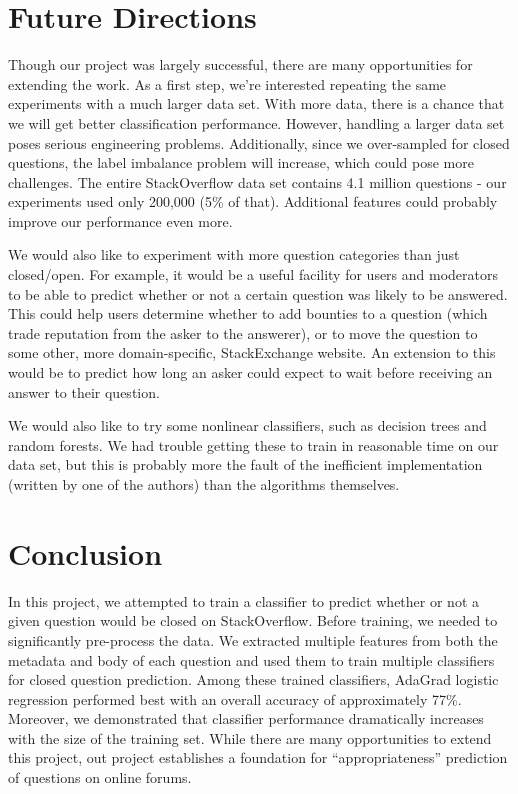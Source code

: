 \documentclass[11pt]{article}
\begin{document}
\section{Future Directions}
Though our project was largely successful, there are many
opportunities for extending the work.  As a first step, we're
interested repeating the same experiments with a much larger data
set. With more data, there is a chance that we will get better
classification performance. However, handling a larger data set poses
serious engineering problems. Additionally, since we over-sampled for closed questions, the label imbalance problem will increase, which could pose more challenges. The entire
StackOverflow data set contains 4.1 million questions - our experiments used only 200,000 (5\% of that).
Additional features could probably improve our performance even more.

We would also like to experiment with more question categories than just closed/open. For example, it would be a useful facility for users and moderators to be able to predict whether or not a certain question was likely to be answered. This could help users determine whether to add bounties to a question (which trade reputation from the asker to the answerer), or to move the question to some other, more domain-specific, StackExchange website. An extension to this would be to predict how long an asker could expect to wait before receiving an answer to their question.

We would also like to try some nonlinear classifiers, such as decision trees and random forests. We had trouble getting these to train in reasonable time on our data set, but this is probably more the fault of the inefficient implementation (written by one of the authors) than the algorithms themselves.

\section{Conclusion}
In this project, we attempted to train a classifier to predict whether
or not a given question would be closed on StackOverflow. Before
training, we needed to significantly pre-process the data. We
extracted multiple features from both the metadata and body of each
question and used them to train multiple classifiers for closed
question prediction. Among these trained classifiers, AdaGrad logistic
regression performed best with an overall accuracy of approximately
77\%. Moreover, we demonstrated that classifier performance
dramatically increases with the size of the training set.  While there
are many opportunities to extend this project, out project establishes
a foundation for ``appropriateness'' prediction of questions on online
forums.

\pagebreak
{}

\end{document}
